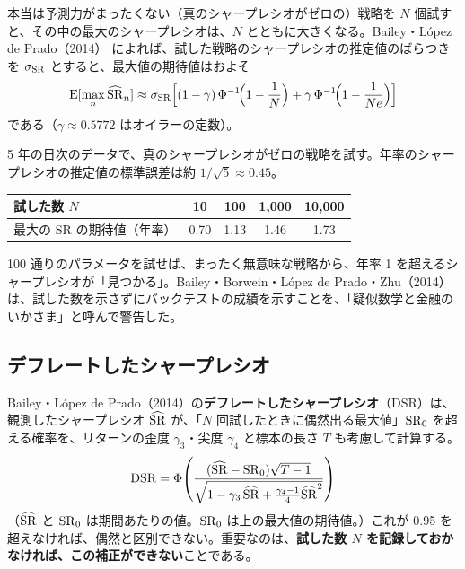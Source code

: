 本当は予測力がまったくない（真のシャープレシオがゼロの）戦略を $N$ 個試すと、その中の最大のシャープレシオは、$N$ とともに大きくなる。Bailey・López de Prado（2014）\cite{dsr2014} によれば、試した戦略のシャープレシオの推定値のばらつきを $\sigma_{\mathrm{SR}}$ とすると、最大値の期待値はおよそ
\begin{equation}
\mathrm{E}[\max_n \widehat{\mathrm{SR}}_n] \approx \sigma_{\mathrm{SR}}\Big[(1-\gamma)\,\Phi^{-1}\!\Big(1 - \frac{1}{N}\Big) + \gamma\,\Phi^{-1}\!\Big(1 - \frac{1}{N e}\Big)\Big]
\end{equation}
である（$\gamma \approx 0.5772$ はオイラーの定数）。

\begin{exbox}[偶然でどれだけ良く見えるか]
5 年の日次のデータで、真のシャープレシオがゼロの戦略を試す。年率のシャープレシオの推定値の標準誤差は約 $1/\sqrt{5} \approx 0.45$。
\begin{center}
\begin{tabular}{@{}lcccc@{}}
\toprule
試した数 $N$ & 10 & 100 & 1{,}000 & 10{,}000 \\
\midrule
最大の SR の期待値（年率） & 0.70 & 1.13 & 1.46 & 1.73 \\
\bottomrule
\end{tabular}
\end{center}
100 通りのパラメータを試せば、まったく無意味な戦略から、年率 1 を超えるシャープレシオが「見つかる」。Bailey・Borwein・López de Prado・Zhu（2014）\cite{charlatanism2014} は、試した数を示さずにバックテストの成績を示すことを、「疑似数学と金融のいかさま」と呼んで警告した。
\end{exbox}

\subsection{デフレートしたシャープレシオ}

Bailey・López de Prado（2014）の\textbf{デフレートしたシャープレシオ}（DSR）は、観測したシャープレシオ $\widehat{\mathrm{SR}}$ が、「$N$ 回試したときに偶然出る最大値」$\mathrm{SR}_0$ を超える確率を、リターンの歪度 $\gamma_3$・尖度 $\gamma_4$ と標本の長さ $T$ も考慮して計算する。
\begin{equation}
\mathrm{DSR} = \Phi\!\left(\frac{(\widehat{\mathrm{SR}} - \mathrm{SR}_0)\sqrt{T-1}}{\sqrt{1 - \gamma_3\,\widehat{\mathrm{SR}} + \frac{\gamma_4 - 1}{4}\widehat{\mathrm{SR}}^2}}\right)
\end{equation}
（$\widehat{\mathrm{SR}}$ と $\mathrm{SR}_0$ は期間あたりの値。$\mathrm{SR}_0$ は上の最大値の期待値。）これが 0.95 を超えなければ、偶然と区別できない。重要なのは、\textbf{試した数 $N$ を記録しておかなければ、この補正ができない}ことである。

